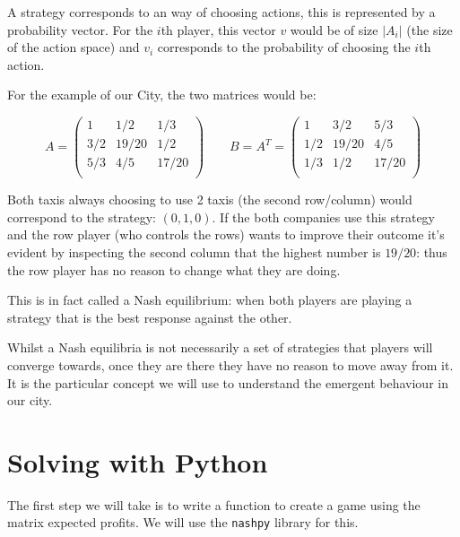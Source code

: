 A strategy corresponds to an way of choosing actions, this is represented by a
probability vector. For the \(i\)th player, this vector \(v\) would be of size
\(|A_i|\) (the size of the action space) and \(v_i\) corresponds to the
probability of choosing the \(i\)th action.

For the example of our City, the two matrices would be:

\[
   A =
        \begin{pmatrix}
            1     & 1 / 2   & 1 / 3 \\
            3 / 2 & 19 / 20 & 1 / 2 \\
            5 / 3 & 4 / 5   & 17 / 20\\
        \end{pmatrix}

   \qquad

   B = A ^T =
        \begin{pmatrix}
            1     & 3 / 2   & 5 / 3 \\
            1 / 2 & 19 / 20 & 4 / 5 \\
            1 / 3 & 1 / 2   & 17 / 20\\
        \end{pmatrix}
\]

Both taxis always choosing to use 2 taxis (the second row/column) would
correspond to the strategy: \((0, 1, 0)\).
If the both companies use this strategy and the row player (who controls the
rows) wants to
improve their outcome it's evident by inspecting the second column that the
highest number is \(19 / 20\): thus the row player has no reason to change what
they are doing.

This is in fact called a Nash equilibrium: when both players are playing a
strategy that is the best response against the other.

Whilst a Nash equilibria is not necessarily a set of strategies that players
will converge towards, once they are there they have no reason to move away from
it. It is the particular concept we will use to understand the emergent
behaviour in our city.

\section{Solving with Python}\label{sec:solving-with-python}

The first step we will take is to write a function to create a game using the
matrix expected profits. We will use the \texttt{nashpy} library for
this.

